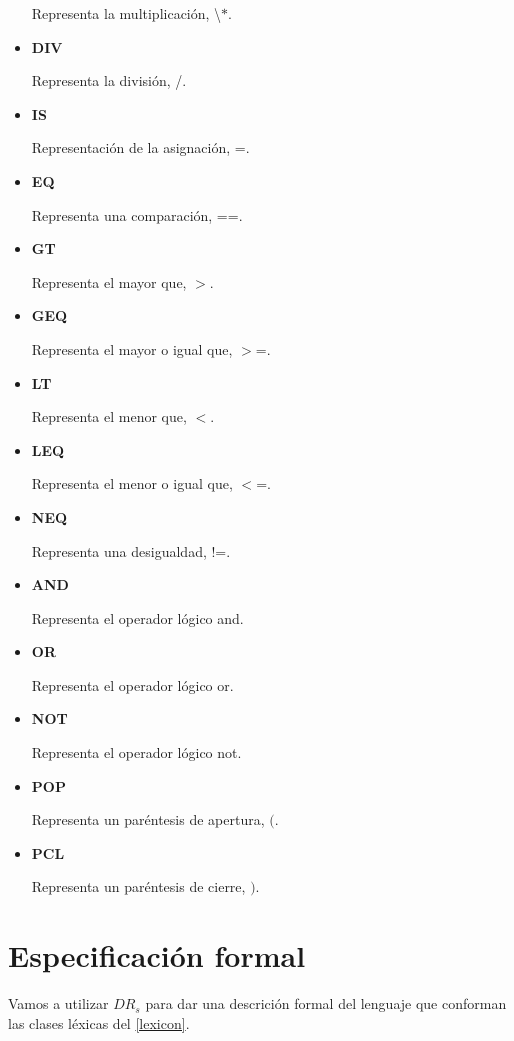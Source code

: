 \documentclass[\main/MemoriaPL.tex]{subfiles}
\begin{document}
\begin{itemize}
        \par
        Representa la multiplicación, \textbackslash $\ast$.
      \item \textbf{DIV}
        \par
        Representa la división, /.
      \item \textbf{IS}
        \par
        Representación de la asignación, =.
      \item \textbf{EQ}
        \par
        Representa una comparación, ==.
      \item \textbf{GT}
        \par
        Representa el mayor que, $>$.
      \item \textbf{GEQ}
        \par
        Representa el mayor o igual que, $>$=.
      \item \textbf{LT}
        \par
        Representa el menor que, $<$.
      \item \textbf{LEQ}
        \par
        Representa el menor o igual que, $<$=.
      \item \textbf{NEQ}
        \par
        Representa una desigualdad, !=.
      \item \textbf{AND}
        \par
        Representa el operador lógico and.
      \item \textbf{OR}
        \par
        Representa el operador lógico or.
      \item \textbf{NOT}
        \par
        Representa el operador lógico not.
      \item \textbf{POP}
        \par
        Representa un paréntesis de apertura, $($.
      \item \textbf{PCL}
        \par
        Representa un paréntesis de cierre, $)$.
    \end{itemize}

  \section{Especificación formal}
    \par
    Vamos a utilizar $DR_s$ para dar una descrición formal del lenguaje que conforman las clases léxicas del \cref{lexicon}.
\end{document}
